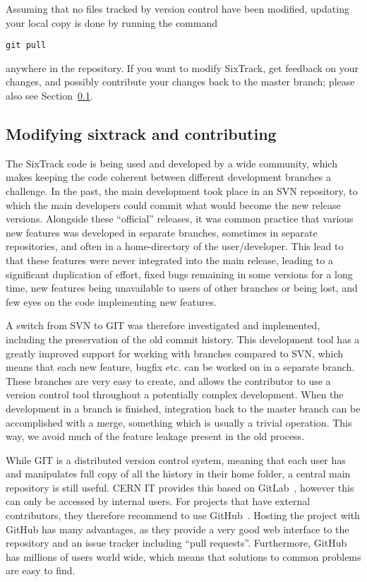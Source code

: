 \documentclass[english,BCOR=0mm,DIV=18]{scrartcl}
\begin{document}
Assuming that no files tracked by version control have been modified, updating your local copy is done by running the command
\begin{lstlisting}
git pull
\end{lstlisting}
anywhere in the repository.
If you want to modify SixTrack, get feedback on your changes, and possibly contribute your changes back to the master branch; please also see Section~\ref{sec:downloading:contributing}.

\subsection{Modifying sixtrack and contributing}
\label{sec:downloading:contributing}


The SixTrack code is being used and developed by a wide community, which makes keeping the code coherent between different development branches a challenge.
In the past, the main development took place in an SVN repository, to which the main developers could commit what would become the new release versions.
Alongside these ``official'' releases, it was common practice that various new features was developed in separate branches, sometimes in separate repositories, and often in a home-directory of the user/developer.
This lead to that these features were never integrated into the main release, leading to a significant duplication of effort, fixed bugs remaining in some versions for a long time, new features being unavailable to users of other branches or being lost, and few eyes on the code implementing new features.

A switch from SVN to GIT was therefore investigated and implemented, including the preservation of the old commit history.
This development tool has a greatly improved support for working with branches compared to SVN, which means that each new feature, bugfix etc. can be worked on in a separate branch.
These branches are very easy to create, and allows the contributor to use a version control tool throughout a potentially complex development.
When the development in a branch is finished, integration back to the master branch can be accomplished with a merge, something which is usually a trivial operation.
This way, we avoid much of the feature leakage present in the old process.

While GIT is a distributed version control system, meaning that each user has and manipulates full copy of all the history in their home folder, a central main repository is still useful.
CERN IT provides this based on GitLab~\cite{CERNgitlab}, however this can only be accessed by internal users.
For projects that have external contributors, they therefore recommend to use GitHub~\cite{CERNgitProviders}.
Hosting the project with GitHub has many advantages, as they provide a very good web interface to the repository and an issue tracker including ``pull requests''.
Furthermore, GitHub has millions of users world wide, which means that solutions to common problems are easy to find.
\end{document}
